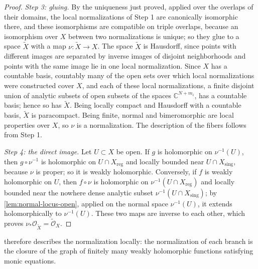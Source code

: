 \begin{proof}
\emph{Step 3: gluing.} By the uniqueness just proved, applied over the overlaps of their domains, the local normalizations of Step 1 are canonically isomorphic there, and these isomorphisms are compatible on triple overlaps, because an isomorphism over $X$ between two normalizations is unique; so they glue to a space $\widetilde X$ with a map $\nu\colon\widetilde X\to X$. The space $\widetilde X$ is Hausdorff, since points with different images are separated by inverse images of disjoint neighborhoods and points with the same image lie in one local normalization. Since $X$ has a countable basis, countably many of the open sets over which local normalizations were constructed cover $X$, and each of these local normalizations, a finite disjoint union of analytic subsets of open subsets of the spaces $\mathbb C^{N+m_i}$, has a countable basis; hence so has $\widetilde X$. Being locally compact and Hausdorff with a countable basis, $\widetilde X$ is paracompact. Being finite, normal and bimeromorphic are local properties over $X$, so $\nu$ is a normalization. The description of the fibers follows from Step 1.

\emph{Step 4: the direct image.} Let $U\subset X$ be open. If $g$ is holomorphic on $\nu^{-1}(U)$, then $g\circ\nu^{-1}$ is holomorphic on $U\cap X_{\mathrm{reg}}$ and locally bounded near $U\cap X_{\mathrm{sing}}$, because $\nu$ is proper; so it is weakly holomorphic. Conversely, if $f$ is weakly holomorphic on $U$, then $f\circ\nu$ is holomorphic on $\nu^{-1}(U\cap X_{\mathrm{reg}})$ and locally bounded near the nowhere dense analytic subset $\nu^{-1}(U\cap X_{\mathrm{sing}})$; by \cref{lem:normal-locus-open}, applied on the normal space $\nu^{-1}(U)$, it extends holomorphically to $\nu^{-1}(U)$. These two maps are inverse to each other, which proves $\nu_*\mathcal O_{\widetilde X}=\widetilde{\mathcal O}_X$.
\end{proof}

 therefore describes the normalization locally: the normalization of each branch is the closure of the graph of finitely many weakly holomorphic functions satisfying monic equations.

